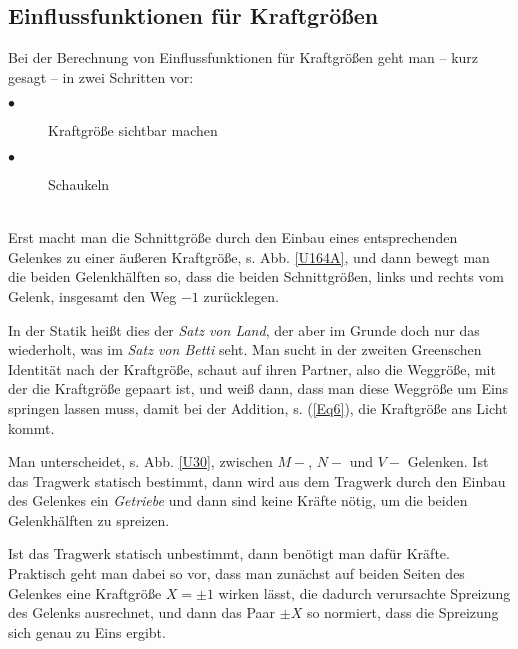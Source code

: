 {\textcolor{sectionTitleBlue}{\section{Einflussfunktionen f\"{u}r Kraftgr\"{o}{\ss}en}}}

Bei der Berechnung von Einflussfunktionen f\"{u}r Kraftgr\"{o}{\ss}en geht man -- kurz gesagt -- in zwei Schritten vor:\\

\colorbox{highlightBlue}{\parbox{0.5\textwidth}{
\begin{description}
  \item[$\bullet$] Kraftgr\"{o}{\ss}e sichtbar machen
  \item[$\bullet$] Schaukeln
\end{description}}}\\

Erst macht man die Schnittgr\"{o}{\ss}e durch den Einbau eines entsprechenden Gelenkes zu einer \"{a}u{\ss}eren Kraftgr\"{o}{\ss}e, s. Abb. \ref{U164A}, und dann bewegt man die beiden Gelenkh\"{a}lften so, dass die beiden Schnittgr\"{o}{\ss}en, links und rechts  vom Gelenk, insgesamt den Weg $-1$ zur\"{u}cklegen.

In der Statik hei{\ss}t dies der {\em Satz von Land\/}, der aber im Grunde doch nur das wiederholt, was im {\em Satz von Betti\/} seht. Man sucht in der zweiten Greenschen Identit\"{a}t nach der Kraftgr\"{o}{\ss}e, schaut auf ihren Partner, also die Weggr\"{o}{\ss}e, mit der die Kraftgr\"{o}{\ss}e gepaart ist, und wei{\ss} dann, dass man diese Weggr\"{o}{\ss}e um Eins springen lassen muss, damit bei der Addition, s. (\ref{Eq6}), die Kraftgr\"{o}{\ss}e \glq ans Licht kommt\grq{}.

Man unterscheidet, s. Abb. \ref{U30}, zwischen $M-$, $N-$ und $V-$ Gelenken. Ist das Tragwerk statisch bestimmt, dann wird aus dem Tragwerk durch den Einbau des Gelenkes ein {\em Getriebe\/} und dann sind keine Kr\"{a}fte n\"{o}tig, um die beiden Gelenkh\"{a}lften zu spreizen.

Ist das Tragwerk statisch unbestimmt, dann ben\"{o}tigt man daf\"{u}r Kr\"{a}fte. Praktisch geht man dabei so vor, dass  man zun\"{a}chst auf beiden Seiten des Gelenkes eine Kraftgr\"{o}{\ss}e $X = \pm 1$ wirken l\"{a}sst, die dadurch verursachte Spreizung des Gelenks ausrechnet, und dann das Paar $\pm X$ so normiert, dass die Spreizung sich genau zu Eins ergibt.


